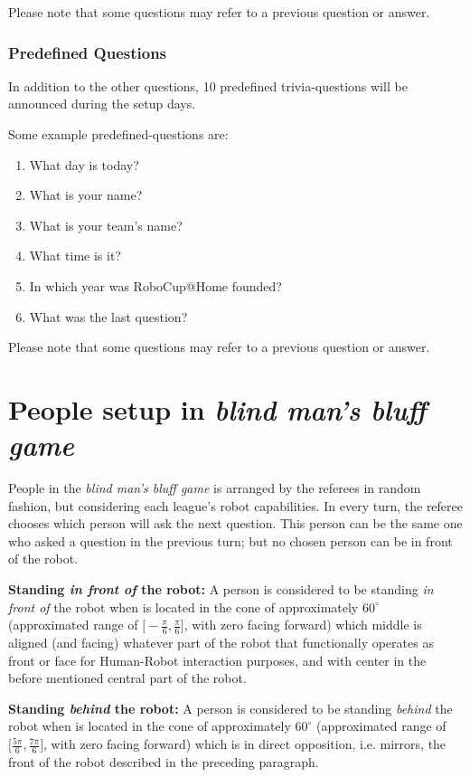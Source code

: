 Please note that some questions may refer to a previous question or answer. 

\subsubsection{Predefined Questions}
In addition to the other questions, 10 predefined trivia-questions will be announced during the setup days.

Some example predefined-questions are:
\begin{enumerate}
    \item What day is today?
    \item What is your name?
    \item What is your team's name?
    \item What time is it?
    \item In which year was RoboCup@Home founded?
    \item What was the last question?
\end{enumerate}

Please note that some questions may refer to a previous question or answer. 

\section{People setup in \textit{blind man's bluff game}}
People in the \textit{blind man's bluff game} is arranged by the referees in random fashion, but considering each league's robot capabilities. In every turn, the referee chooses which person will ask the next question. This person can be the same one who asked a question in the previous turn; but no chosen person can be in front of the robot.

\textbf{Standing \textit{in front of} the robot:} A person is considered to be standing \textit{in front of} the robot when is located in the cone of approximately $60^{\circ}$ (approximated range of $\big[-\frac{\pi}{6}, \frac{\pi}{6}\big]$, with zero facing forward) which middle is aligned (and facing) whatever part of the robot that functionally operates as front or face for Human-Robot interaction purposes, and with center in the before mentioned central part of the robot.

\textbf{Standing \textit{behind} the robot:} A person is considered to be standing \textit{behind} the robot when is located in the cone of approximately $60^{\circ}$ (approximated range of $\big[\frac{5\pi}{6}, \frac{7\pi}{6}\big]$, with zero facing forward) which is in direct opposition, i.e. mirrors, the front of the robot described in the preceding paragraph.

